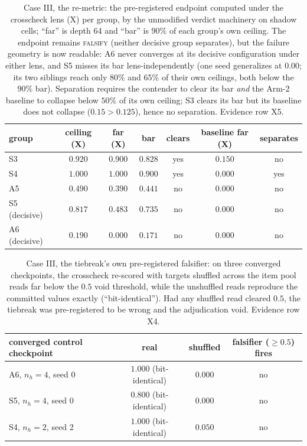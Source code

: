 \begin{table}[H]
\centering
\footnotesize
\begin{tabular}{@{}lcccccc@{}}
\toprule
group & ceiling (X) & far (X) & bar & clears & baseline far (X) & separates \\
\midrule
S3 & $0.920$ & $0.900$ & $0.828$ & yes & $0.150$ & no \\
S4 & $1.000$ & $1.000$ & $0.900$ & yes & $0.000$ & yes \\
A5 & $0.490$ & $0.390$ & $0.441$ & no & $0.000$ & no \\
S5 (decisive) & $0.817$ & $0.483$ & $0.735$ & no & $0.000$ & no \\
A6 (decisive) & $0.190$ & $0.000$ & $0.171$ & no & $0.000$ & no \\
\bottomrule
\end{tabular}
\caption{Case III, the re-metric: the pre-registered endpoint computed
under the crosscheck lens (X) per group, by the unmodified verdict
machinery on shadow cells; ``far'' is depth 64 and ``bar'' is $90\%$
of each group's own ceiling. The endpoint remains \textsc{falsify}
(neither decisive group separates), but the failure geometry is now
readable: A6 never converges at its decisive configuration under
either lens, and S5 misses its bar lens-independently (one seed
generalizes at $0.00$; its two siblings reach only $80\%$ and $65\%$
of their own ceilings, both below the $90\%$ bar). Separation
requires the contender to clear its bar \emph{and} the Arm-2 baseline
to collapse below $50\%$ of its own ceiling; S3 clears its bar but
its baseline does not collapse ($0.15>0.125$), hence no separation.
Evidence row X5.}
\label{tab:remetric}
\end{table}

\begin{table}[H]
\centering
\footnotesize
\begin{tabular}{@{}lccc@{}}
\toprule
converged control checkpoint & real & shuffled & falsifier ($\geq0.5$) fires \\
\midrule
A6, $n_h{=}4$, seed 0 & $1.000$ (bit-identical) & $0.000$ & no \\
S5, $n_h{=}4$, seed 0 & $0.800$ (bit-identical) & $0.000$ & no \\
S4, $n_h{=}2$, seed 2 & $1.000$ (bit-identical) & $0.050$ & no \\
\bottomrule
\end{tabular}
\caption{Case III, the tiebreak's own pre-registered falsifier: on
three converged checkpoints, the crosscheck re-scored with targets
shuffled across the item pool reads far below the $0.5$ void
threshold, while the unshuffled reads reproduce the committed values
exactly (``bit-identical''). Had any shuffled read cleared $0.5$, the
tiebreak was pre-registered to be wrong and the adjudication void.
Evidence row X4.}
\label{tab:teeth}
\end{table}
